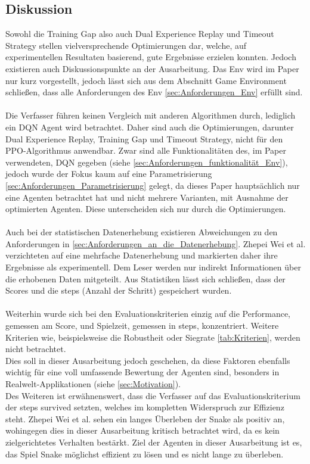 \subsection{Diskussion} \label{sec:Paper_1_Diskussion}
Sowohl die Training Gap also auch Dual Experience Replay und Timeout Strategy stellen vielversprechende Optimierungen dar, welche, auf experimentellen Resultaten basierend, gute Ergebnisse erzielen konnten. Jedoch existieren auch Diskussionspunkte an der Ausarbeitung.
Das Env wird im Paper nur kurz vorgestellt, jedoch lässt sich aus dem Abschnitt Game Environment schließen, dass alle Anforderungen des Env \ref{sec:Anforderungen_Env} erfüllt sind.\\
\\Die Verfasser führen keinen Vergleich mit anderen Algorithmen durch, lediglich ein DQN Agent wird betrachtet. 
Daher sind auch die Optimierungen, darunter Dual Experience Replay, Training Gap und Timeout Strategy, nicht für den PPO-Algorithmus anwendbar. 
Zwar sind alle Funktionalitäten des, im Paper verwendeten, DQN gegeben 
(siehe \ref{sec:Anforderungen_funktionalität_Env}), jedoch wurde der Fokus kaum auf eine Parametrisierung \ref{sec:Anforderungen_Parametrisierung} gelegt, da dieses Paper hauptsächlich nur eine Agenten betrachtet hat und nicht mehrere Varianten, mit Ausnahme der optimierten Agenten. Diese unterscheiden sich nur durch die Optimierungen.\\
\\Auch bei der statistischen Datenerhebung existieren Abweichungen zu den Anforderungen in \ref{sec:Anforderungen_an_die_Datenerhebung}. Zhepei Wei et al. verzichteten auf eine mehrfache Datenerhebung und markierten daher ihre Ergebnisse als experimentell. Dem Leser werden nur indirekt Informationen über die erhobenen Daten mitgeteilt. Aus Statistiken lässt sich schließen, dass der Scores und die steps (Anzahl der Schritt) gespeichert wurden.\\
\\Weiterhin wurde sich bei den Evaluationskriterien einzig auf die Performance, gemessen am Score, und Spielzeit, gemessen in steps, konzentriert. Weitere Kriterien wie, beispielsweise die Robustheit oder Siegrate \ref{tab:Kriterien}, werden nicht betrachtet.\\
Dies soll in dieser Ausarbeitung jedoch geschehen, da diese Faktoren ebenfalls wichtig für eine voll umfassende Bewertung der Agenten sind, besonders in Realwelt-Applikationen (siehe \ref{sec:Motivation}).\\ 
Des Weiteren ist erwähnenswert, dass die Verfasser auf das Evaluationskriterium der steps survived setzten, welches im kompletten Widerspruch zur Effizienz steht. Zhepei Wei et al. sehen ein langes Überleben der Snake als positiv an, wohingegen dies in dieser Ausarbeitung kritisch betrachtet wird, da es kein zielgerichtetes Verhalten bestärkt. Ziel der Agenten in dieser Ausarbeitung ist es, das Spiel Snake möglichst effizient zu lösen und es nicht lange zu überleben.

